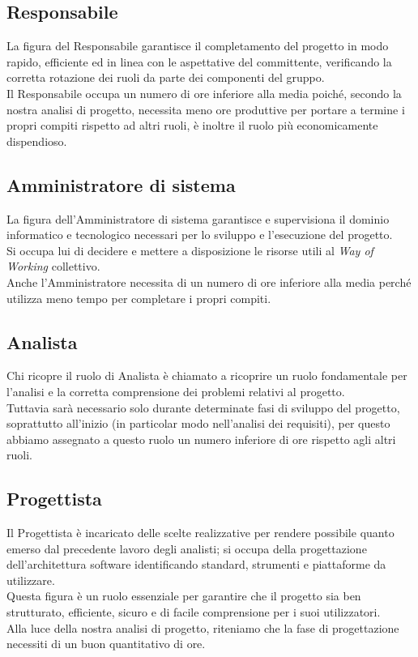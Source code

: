 \documentclass[a4paper, 11pt]{article}
\begin{document}
\subsection{Responsabile}
La figura del Responsabile garantisce il completamento del progetto in modo rapido, efficiente ed in linea con le aspettative del committente, verificando la corretta rotazione dei ruoli da parte dei componenti del gruppo. \\
Il Responsabile occupa un numero di ore inferiore alla media poiché, secondo la nostra analisi di progetto, necessita meno ore produttive per portare a termine i propri compiti rispetto ad altri ruoli, è inoltre il ruolo più economicamente dispendioso.

\subsection{Amministratore di sistema}

La figura dell'Amministratore di sistema garantisce e supervisiona il dominio informatico e tecnologico necessari per lo sviluppo e l'esecuzione del progetto. \\
Si occupa lui di decidere e mettere a disposizione le risorse utili al \textit{Way of Working} collettivo. \\
Anche l'Amministratore necessita di un numero di ore inferiore alla media perché utilizza meno tempo per completare i propri compiti.

\subsection{Analista}
Chi ricopre il ruolo di Analista è chiamato a ricoprire un ruolo fondamentale per l'analisi e la corretta comprensione dei problemi relativi al progetto. \\
Tuttavia sarà necessario solo durante determinate fasi di sviluppo del progetto, soprattutto all'inizio (in particolar modo nell'analisi dei requisiti), per questo abbiamo assegnato a questo ruolo un numero inferiore di ore rispetto agli altri ruoli.
\pagebreak
\subsection{Progettista}

Il Progettista è incaricato delle scelte realizzative per rendere possibile quanto emerso dal precedente lavoro degli analisti; si occupa della progettazione dell'architettura software identificando standard, strumenti e piattaforme da utilizzare. \\
Questa figura è un ruolo essenziale per garantire che il progetto sia ben strutturato, efficiente, sicuro e di facile comprensione per i suoi utilizzatori. \\
Alla luce della nostra analisi di progetto, riteniamo che la fase di progettazione necessiti di un buon quantitativo di ore.
\end{document}
